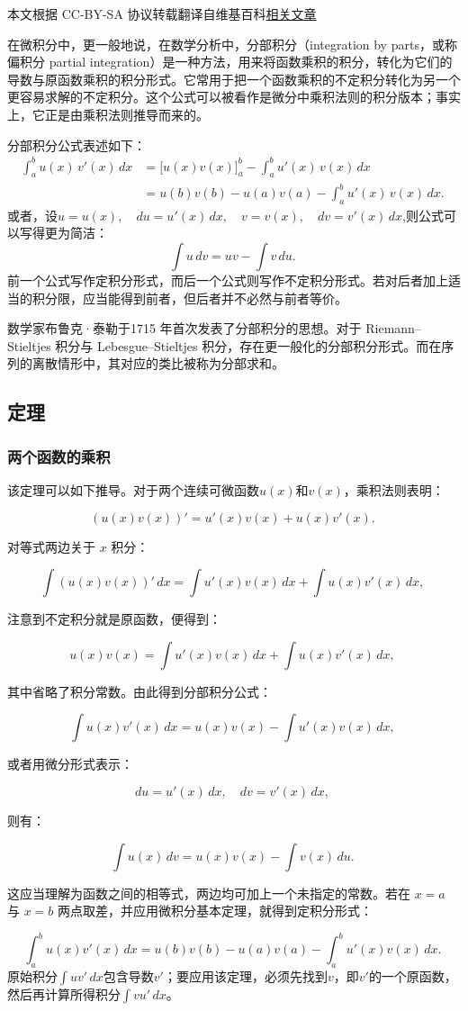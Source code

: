 
本文根据 CC-BY-SA 协议转载翻译自维基百科\href{https://en.wikipedia.org/wiki/Integration_by_parts}{相关文章}

在微积分中，更一般地说，在数学分析中，分部积分（integration by parts，或称偏积分 partial integration）是一种方法，用来将函数乘积的积分，转化为它们的导数与原函数乘积的积分形式。它常用于把一个函数乘积的不定积分转化为另一个更容易求解的不定积分。这个公式可以被看作是微分中乘积法则的积分版本；事实上，它正是由乘积法则推导而来的。

分部积分公式表述如下：
$$
\begin{aligned}
\int_{a}^{b} u(x)\,v'(x)\,dx &= \Big[u(x)v(x)\Big]_{a}^{b} - \int_{a}^{b} u'(x)\,v(x)\,dx \\
&= u(b)v(b) - u(a)v(a) - \int_{a}^{b} u'(x)\,v(x)\,dx .
\end{aligned}~
$$
或者，设$u = u(x), \quad du = u'(x)\,dx, \quad v = v(x), \quad dv = v'(x)\,dx$,则公式可以写得更为简洁：
$$
\int u\,dv = uv - \int v\,du .~
$$
前一个公式写作定积分形式，而后一个公式则写作不定积分形式。若对后者加上适当的积分限，应当能得到前者，但后者并不必然与前者等价。

数学家布鲁克·泰勒于1715 年首次发表了分部积分的思想。对于 Riemann–Stieltjes 积分与 Lebesgue–Stieltjes 积分，存在更一般化的分部积分形式。而在序列的离散情形中，其对应的类比被称为分部求和。
\subsection{定理}
\subsubsection{两个函数的乘积}
该定理可以如下推导。对于两个连续可微函数$u(x)$和$v(x)$，乘积法则表明：

$$
(u(x)v(x))' = u'(x)v(x) + u(x)v'(x).~
$$

对等式两边关于 $x$ 积分：

$$
\int (u(x)v(x))'\,dx = \int u'(x)v(x)\,dx + \int u(x)v'(x)\,dx,~
$$

注意到不定积分就是原函数，便得到：

$$
u(x)v(x) = \int u'(x)v(x)\,dx + \int u(x)v'(x)\,dx,~
$$

其中省略了积分常数。由此得到分部积分公式：

$$
\int u(x)v'(x)\,dx = u(x)v(x) - \int u'(x)v(x)\,dx,~
$$

或者用微分形式表示：

$$
du = u'(x)\,dx, \quad dv = v'(x)\,dx,~
$$

则有：

$$
\int u(x)\,dv = u(x)v(x) - \int v(x)\,du.~
$$

这应当理解为函数之间的相等式，两边均可加上一个未指定的常数。若在 $x=a$ 与 $x=b$ 两点取差，并应用微积分基本定理，就得到定积分形式：

$$
\int_{a}^{b} u(x)v'(x)\,dx = u(b)v(b) - u(a)v(a) - \int_{a}^{b} u'(x)v(x)\,dx.~
$$
原始积分$\int u v'\,dx$包含导数$v'$；要应用该定理，必须先找到$v$，即$v'$的一个原函数，然后再计算所得积分$\int v u'\,dx$。
